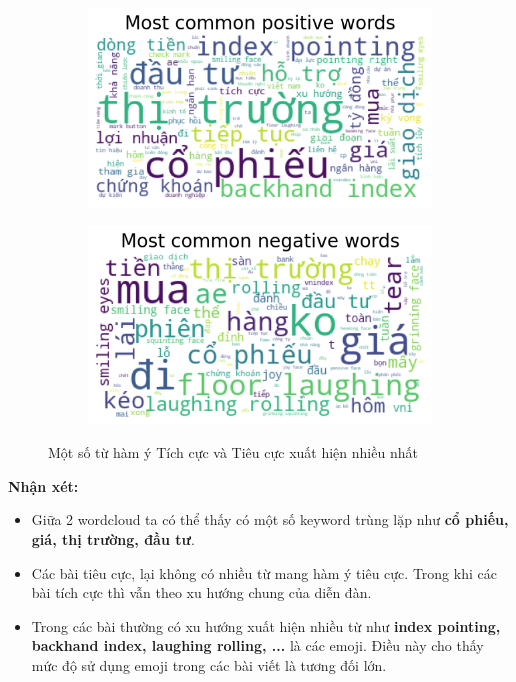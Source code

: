\begin{figure}[H]
  \begin{subfigure}{.5\textwidth}
  \centering
    \includegraphics[width=1\linewidth]{images/plot-2.15-wordcloud.png}
  \end{subfigure}%
  \begin{subfigure}{.5\textwidth}
  \centering
    \includegraphics[width=1\linewidth]{images/plot-2.16-wordcloud.png}
  \end{subfigure}
  \vspace{-2em}
  \caption{Một số từ hàm ý Tích cực và Tiêu cực xuất hiện nhiều nhất}
  \label{fig:2.4}
\end{figure}

\textbf{Nhận xét:}
\begin{itemize}
\item Giữa 2 wordcloud ta có thể thấy có một số keyword trùng lặp như \textbf{cổ phiếu, giá, thị trường, đầu tư}.
\item Các bài tiêu cực, lại không có nhiều từ mang hàm ý tiêu cực. Trong khi các bài tích cực thì vẫn theo xu hướng chung của diễn đàn.
\item Trong các bài thường có xu hướng xuất hiện nhiều từ như \textbf{index pointing, backhand index, laughing rolling, ...} là các emoji. Điều này cho thấy mức độ sử dụng emoji trong các bài viết là tương đối lớn.
\end{itemize}

